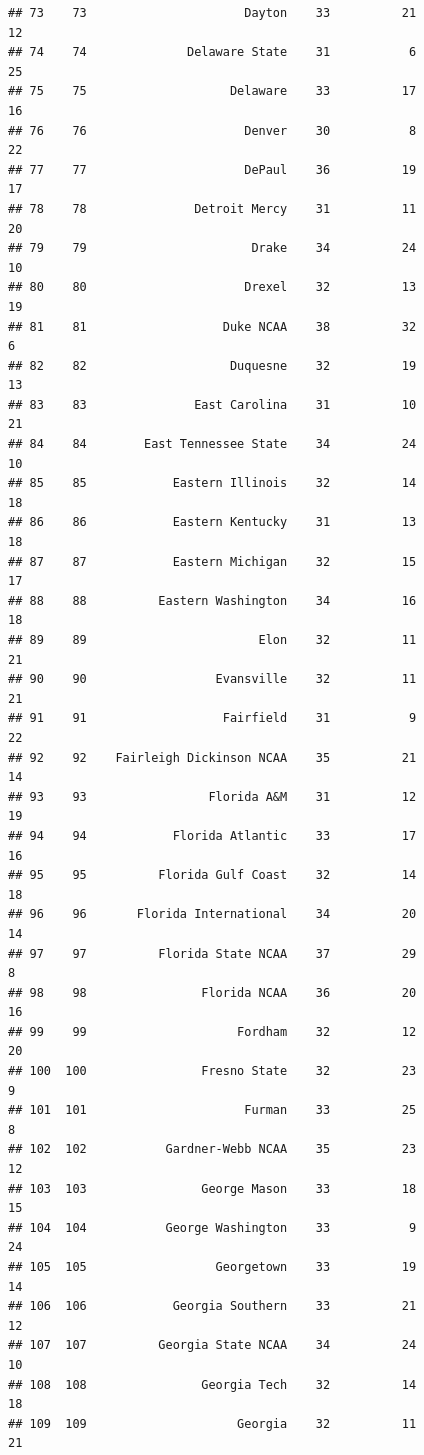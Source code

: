 \documentclass[]{book}
\begin{document}
\begin{verbatim}
## 73    73                      Dayton    33          21            12
## 74    74              Delaware State    31           6            25
## 75    75                    Delaware    33          17            16
## 76    76                      Denver    30           8            22
## 77    77                      DePaul    36          19            17
## 78    78               Detroit Mercy    31          11            20
## 79    79                       Drake    34          24            10
## 80    80                      Drexel    32          13            19
## 81    81                   Duke NCAA    38          32             6
## 82    82                    Duquesne    32          19            13
## 83    83               East Carolina    31          10            21
## 84    84        East Tennessee State    34          24            10
## 85    85            Eastern Illinois    32          14            18
## 86    86            Eastern Kentucky    31          13            18
## 87    87            Eastern Michigan    32          15            17
## 88    88          Eastern Washington    34          16            18
## 89    89                        Elon    32          11            21
## 90    90                  Evansville    32          11            21
## 91    91                   Fairfield    31           9            22
## 92    92    Fairleigh Dickinson NCAA    35          21            14
## 93    93                 Florida A&M    31          12            19
## 94    94            Florida Atlantic    33          17            16
## 95    95          Florida Gulf Coast    32          14            18
## 96    96       Florida International    34          20            14
## 97    97          Florida State NCAA    37          29             8
## 98    98                Florida NCAA    36          20            16
## 99    99                     Fordham    32          12            20
## 100  100                Fresno State    32          23             9
## 101  101                      Furman    33          25             8
## 102  102           Gardner-Webb NCAA    35          23            12
## 103  103                George Mason    33          18            15
## 104  104           George Washington    33           9            24
## 105  105                  Georgetown    33          19            14
## 106  106            Georgia Southern    33          21            12
## 107  107          Georgia State NCAA    34          24            10
## 108  108                Georgia Tech    32          14            18
## 109  109                     Georgia    32          11            21

\end{verbatim}
\end{document}
